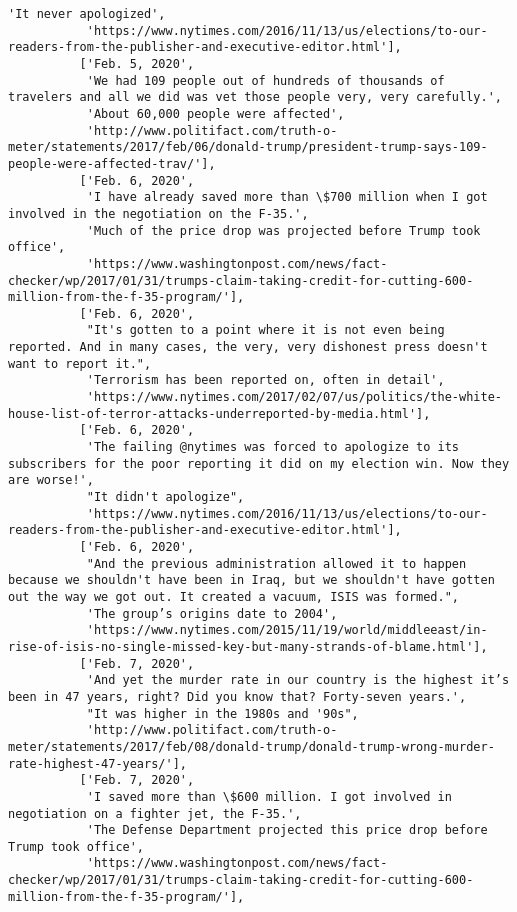 \documentclass[11pt]{article}
\begin{document}
\begin{Verbatim}[commandchars=\\\{\}]
           'It never apologized',
           'https://www.nytimes.com/2016/11/13/us/elections/to-our-readers-from-the-publisher-and-executive-editor.html'],
          ['Feb. 5, 2020',
           'We had 109 people out of hundreds of thousands of travelers and all we did was vet those people very, very carefully.',
           'About 60,000 people were affected',
           'http://www.politifact.com/truth-o-meter/statements/2017/feb/06/donald-trump/president-trump-says-109-people-were-affected-trav/'],
          ['Feb. 6, 2020',
           'I have already saved more than \$700 million when I got involved in the negotiation on the F-35.',
           'Much of the price drop was projected before Trump took office',
           'https://www.washingtonpost.com/news/fact-checker/wp/2017/01/31/trumps-claim-taking-credit-for-cutting-600-million-from-the-f-35-program/'],
          ['Feb. 6, 2020',
           "It's gotten to a point where it is not even being reported. And in many cases, the very, very dishonest press doesn't want to report it.",
           'Terrorism has been reported on, often in detail',
           'https://www.nytimes.com/2017/02/07/us/politics/the-white-house-list-of-terror-attacks-underreported-by-media.html'],
          ['Feb. 6, 2020',
           'The failing @nytimes was forced to apologize to its subscribers for the poor reporting it did on my election win. Now they are worse!',
           "It didn't apologize",
           'https://www.nytimes.com/2016/11/13/us/elections/to-our-readers-from-the-publisher-and-executive-editor.html'],
          ['Feb. 6, 2020',
           "And the previous administration allowed it to happen because we shouldn't have been in Iraq, but we shouldn't have gotten out the way we got out. It created a vacuum, ISIS was formed.",
           'The group’s origins date to 2004',
           'https://www.nytimes.com/2015/11/19/world/middleeast/in-rise-of-isis-no-single-missed-key-but-many-strands-of-blame.html'],
          ['Feb. 7, 2020',
           'And yet the murder rate in our country is the highest it’s been in 47 years, right? Did you know that? Forty-seven years.',
           "It was higher in the 1980s and '90s",
           'http://www.politifact.com/truth-o-meter/statements/2017/feb/08/donald-trump/donald-trump-wrong-murder-rate-highest-47-years/'],
          ['Feb. 7, 2020',
           'I saved more than \$600 million. I got involved in negotiation on a fighter jet, the F-35.',
           'The Defense Department projected this price drop before Trump took office',
           'https://www.washingtonpost.com/news/fact-checker/wp/2017/01/31/trumps-claim-taking-credit-for-cutting-600-million-from-the-f-35-program/'],

\end{Verbatim}
\end{document}
